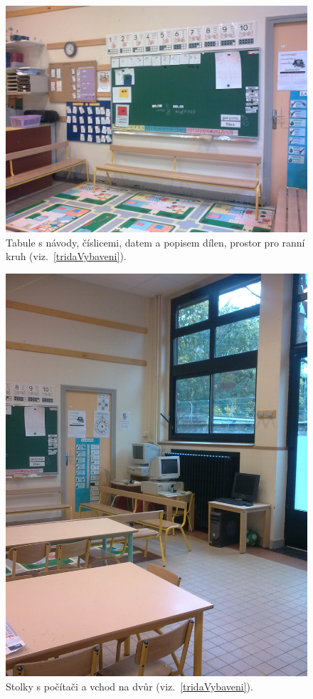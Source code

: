 	\begin{figure}[tb]
		\centering
		\includegraphics[height = 0.35\textheight]{./fotky/Obr1.jpg}
		\caption{
			Tabule s návody, číslicemi, datem a popisem dílen, prostor pro ranní kruh (viz.~\ref{tridaVybaveni}).
		}
		\label{Obr1}
	\end{figure}

	\begin{figure}[tb]
		\centering
		\includegraphics[height = 0.35\textheight]{./fotky/Obr2.jpg}
		\caption{
			Stolky s počítači a vchod na dvůr (viz.~\ref{tridaVybaveni}).
		}
		\label{Obr2}
	\end{figure}

